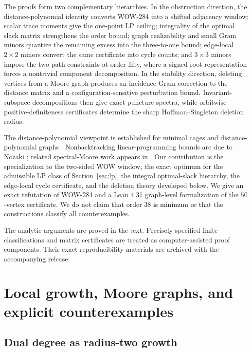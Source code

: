 \documentclass[a4paper,10pt,reqno]{amsart}
\theoremstyle{plain}
\theoremstyle{definition}
\theoremstyle{remark}
\begin{document}
The proofs form two complementary hierarchies.  In the obstruction direction,
the distance-polynomial identity converts WOW-284 into a shifted adjacency
window; scalar trace moments give the one-point LP ceiling; integrality of the
optimal slack matrix strengthens the order bound; graph realizability and
 small Gram minors quantize the remaining excess into the three-to-one bound;
edge-local \(2\times2\) minors convert the same certificate into cycle counts;
and \(3\times3\) minors impose the two-path constraints at order fifty, where
a signed-root representation forces a nontrivial component decomposition.
In the stability
direction, deleting vertices from a Moore graph produces an incidence-Gram
correction to the distance matrix and a configuration-sensitive perturbation
bound.
Invariant-subspace decompositions then give exact puncture spectra, while
orbitwise positive-definiteness certificates determine the sharp
Hoffman--Singleton deletion radius.

The distance-polynomial viewpoint is established for minimal cages and
distance-polynomial graphs
\cite{HowladerPanigrahi2022,Fiol2016}.  Nonbacktracking linear-programming
bounds are due to Nozaki \cite{Nozaki2015}; related spectral-Moore work appears
in \cite{CioabaEtAl2016}.  Our contribution is the specialization to
the two-sided WOW window, the exact optimum for the admissible LP class of
Section~\ref{sec:lp}, the integral optimal-slack hierarchy, the edge-local
cycle certificate, and the deletion theory developed below.  We give an exact
refutation of WOW-284 and a Lean 4.31 graph-level formalization of the
\(50\)-vertex certificate.  We do not claim that order \(38\) is minimum or
that the constructions classify all counterexamples.

The analytic arguments are proved in the text.  Precisely specified finite
classifications and matrix certificates are treated as computer-assisted proof
components.  Their exact reproducibility materials are archived with the
accompanying release.

\section{Local growth, Moore graphs, and explicit counterexamples}
\label{sec:examples}

\subsection{Dual degree as radius-two growth}
\end{document}
